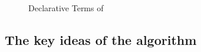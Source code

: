 \begin{figure}[h]
  \begin{multicols}{2}
    \ottgrammartabular{
      \ottc\ottinterrule
    }

    \ottgrammartabular{
      \ottv\ottinterrule
    }
  \end{multicols}
  \caption{Declarative Terms of \fexists}
  \label{fig:declarative-terms}
\end{figure}

\subsection{The key ideas of the algorithm}

